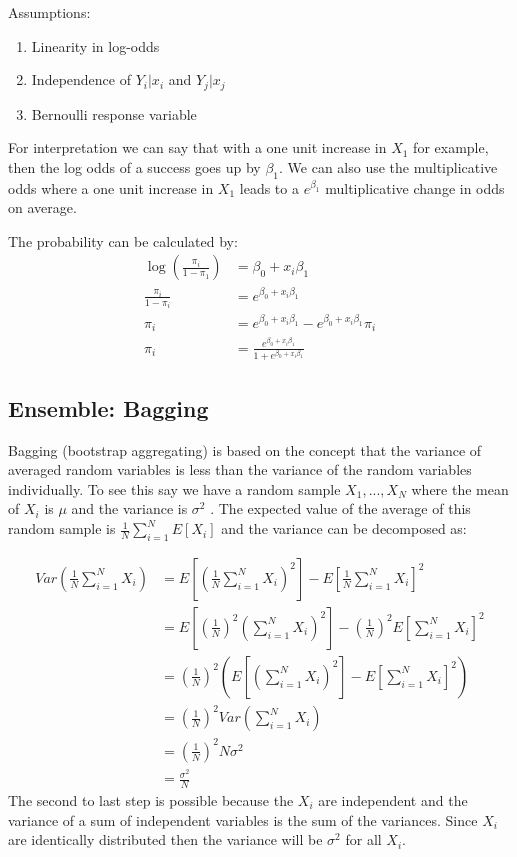 \documentclass[paper=a4, fontsize=11pt]{scrartcl} %
\numberwithin{equation}{section} %
\numberwithin{figure}{section} %
\numberwithin{table}{section} %
\begin{document}
Assumptions:
\begin{enumerate}
\item Linearity in log-odds
\item Independence of $Y_i|x_i$ and $Y_j|x_j$
\item Bernoulli response variable
\end{enumerate}

For interpretation we can say that with a one unit increase in $X_1$ for example, then the log odds of a success goes up by $\beta_1$. We can also use the multiplicative odds where a one unit increase in $X_1$ leads to a $e^{\beta_1}$ multiplicative change in odds on average.

The probability can be calculated by:
\begin{equation}
\begin{split}
\log \left(\frac{\pi_i}{1-\pi_1} \right) & = \beta_0 + x_i \beta_1 \\
\frac{\pi_i}{1-\pi_i} &= e^{\beta_0 + x_i \beta_1} \\
\pi_i &= e^{\beta_0 + x_i \beta_1} - e^{\beta_0 + x_i \beta_1} \pi_i \\
\pi_i &= \frac{e^{\beta_0 + x_i \beta_1}}{1+e^{\beta_0 + x_i \beta_1}}
\end{split}
\end{equation}

\subsection{Ensemble: Bagging}

Bagging (bootstrap aggregating) is based on the concept that the variance of averaged random variables is less than the variance of the random variables individually. To see this say we have a random sample $X_1,..., X_N$ where the mean of $X_i$ is $\mu$ and the variance is $\sigma^2$ . The expected value of the average of this random sample is $\frac{1}{N}\sum_{i=1}^N{E[X_i]}$ and the variance can be decomposed as:

\begin{equation}
\begin{split}
Var \left(\frac{1}{N}\sum_{i=1}^N{X_i} \right) &=  E\left[ \left(\frac{1}{N}\sum_{i=1}^N{X_i}\right)^2 \right] - E\left[\frac{1}{N}\sum_{i=1}^N{X_i}\right]^2 \\
&= E\left[ \left(\frac{1}{N}\right)^2 \left(\sum_{i=1}^N{X_i}\right)^2 \right] - \left(\frac{1}{N} \right)^2 E\left[\sum_{i=1}^N{X_i}\right]^2 \\
&= \left(\frac{1}{N} \right)^2 \left( E\left[\left(\sum_{i=1}^N{X_i}\right)^2 \right] - E\left[\sum_{i=1}^N{X_i}\right]^2    \right) \\
&= \left(\frac{1}{N} \right)^2 Var\left(\sum_{i=1}^N{X_i}\right)\\
&= \left(\frac{1}{N} \right)^2 N \sigma^2\\
&= \frac{\sigma^2}{N}
\end{split}
\end{equation}
The second to last step is possible because the $X_i$ are independent and the variance of a sum of independent variables is the sum of the variances. Since $X_i$ are identically distributed then the variance will be $\sigma^2$ for all $X_i$.
\end{document}
